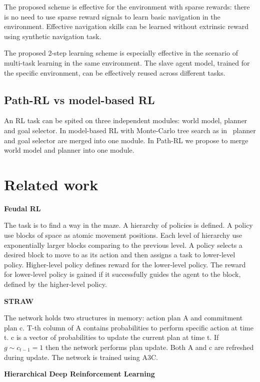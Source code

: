 \documentclass{article}
\begin{document}
The proposed scheme is effective for the environment with sparse rewards: there is no need to use sparse reward signals to learn basic navigation in the environment. Effective navigation skills can be learned without extrinsic reward using synthetic navigation task.

The proposed 2-step learning scheme is especially effective in the scenario of multi-task learning in the same environment. The slave agent model, trained for the specific environment, can be effectively reused across different tasks.

\subsection{Path-RL vs model-based RL}

An RL task can be spited on three independent modules: world model, planner and goal selector. In model-based RL with Monte-Carlo tree search as in~\citep{Schrittwieser2020MasteringAG} planner and goal selector are merged into one module. In Path-RL we propose to merge world model and planner into one module.

\section{Related work}

\textbf{Feudal RL}~\citep{Dayan1992FeudalRL}

The task is to find a way in the maze. A hierarchy of policies is defined. A policy use blocks of space as atomic movement positions. Each level of hierarchy use exponentially larger blocks comparing to the previous level. A policy selects a desired block to move to as its action and then assigns a task to lower-level policy. Higher-level policy defines reward for the lower-level policy. The reward for lower-level policy is gained if it successfully guides the agent to the block, defined by the higher-level policy.

\textbf{STRAW}~\citep{Vezhnevets2016StrategicAW}

The network holds two structures in memory: action plan A and commitment plan c. T-th column of A contains probabilities to perform specific action at time t. c is a vector of probabilities to update the current plan at time t. If $g \sim c_{t-1} = 1$ then the network performs plan update. Both A and c are refreshed during update. The network is trained using A3C.

\textbf{Hierarchical Deep Reinforcement Learning}~\citep{Kulkarni2016HierarchicalDR}
\end{document}
